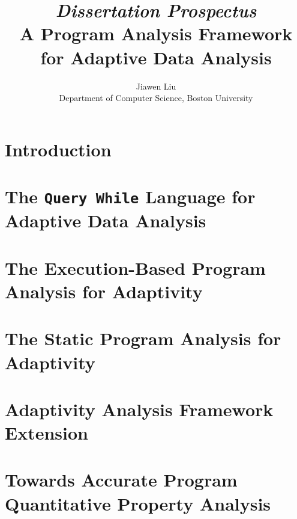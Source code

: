 \documentclass[a4paper,11pt]{article}
\begin{document}
\title{{\em Dissertation Prospectus}
\\ {A Program Analysis Framework for Adaptive Data Analysis}
}

\author{Jiawen Liu\\ Department of Computer Science, Boston University}
\maketitle
\begin{abstract}

\end{abstract}

\clearpage
\tableofcontents{}

\clearpage
\section{Introduction}
\label{sec:introduction}


\section{The {\tt Query While} Language for Adaptive Data Analysis}
\label{sec:language}


\section{The Execution-Based Program Analysis for Adaptivity}
\label{sec:dynamic}


\section{The Static Program Analysis for Adaptivity}
\label{sec:static}



\section{Adaptivity Analysis Framework Extension}
\label{sec:furthers}


\section{Towards Accurate Program Quantitative Property Analysis}
\label{sec:generalization}

\end{document}
